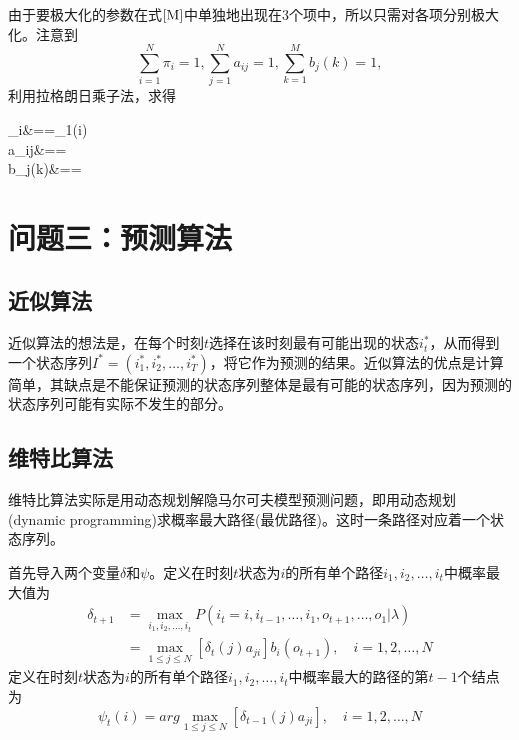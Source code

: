 \begin{enumerate}
	由于要极大化的参数在式$\ref{M}$中单独地出现在3个项中，所以只需对各项分别极大化。注意到
	\begin{equation*}
		\sum_{i=1}^{N}\pi_i=1,\sum_{j=1}^{N}a_{ij}=1,\sum_{k=1}^{M}b_j(k)=1,
	\end{equation*}
	利用拉格朗日乘子法，求得
	\begin{flalign}
		\pi_i&==\gamma_1(i)\\
		a_{ij}&==\\
		b_j(k)&==
	\end{flalign}
\end{enumerate}
\section*{问题三：预测算法}
\subsection*{近似算法}
近似算法的想法是，在每个时刻$t$选择在该时刻最有可能出现的状态$i_t^*$，从而得到一个状态序列$I^*=(i_1^*,i_2^*,\dots,i_T^*)$，将它作为预测的结果。近似算法的优点是计算简单，其缺点是不能保证预测的状态序列整体是最有可能的状态序列，因为预测的状态序列可能有实际不发生的部分。
\subsection*{维特比算法}
维特比算法实际是用动态规划解隐马尔可夫模型预测问题，即用动态规划(dynamic programming)求概率最大路径(最优路径)。这时一条路径对应着一个状态序列。

首先导入两个变量$\delta$和$\psi$。定义在时刻$t$状态为$i$的所有单个路径$i_1,i_2,\dots,i_t$中概率最大值为
\begin{equation}
	\begin{aligned}
		\delta_{t+1}&=\mathop{max}\limits_{i_1,i_2,\dots,i_t}P(i_t=i,i_{t-1},\dots,i_1,o_{t+1},\dots,o_1|\lambda)\\
		&=\mathop{max}\limits_{1\leqslant j\leqslant N}[\delta_{t}(j)a_{ji}]b_{i}(o_{t+1}),\quad i=1,2,\dots,N
	\end{aligned}
\end{equation}
定义在时刻$t$状态为$i$的所有单个路径$i_1,i_2,\dots,i_t$中概率最大的路径的第$t-1$个结点为
\begin{equation}
	\psi_t(i)=arg \mathop{max}\limits_{1\leqslant j\leqslant N}[\delta_{t-1}(j)a_{ji}],\quad i=1,2,\dots,N
\end{equation}

